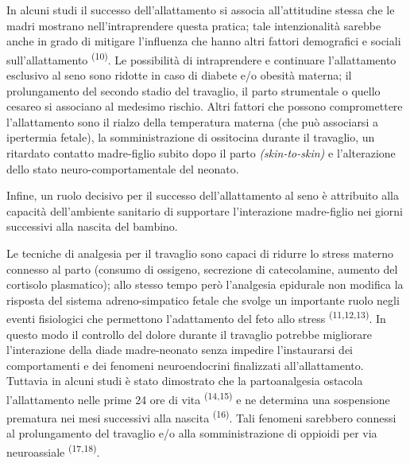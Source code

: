 \documentclass[]{article}
\begin{document}
In alcuni studi il successo dell'allattamento si associa all'attitudine
stessa che le madri mostrano nell'intraprendere questa pratica; tale
intenzionalità sarebbe anche in grado di mitigare l'influenza che hanno
altri fattori demografici e sociali sull'allattamento
\textsuperscript{(10)}. Le possibilità di intraprendere e continuare
l'allattamento esclusivo al seno sono ridotte in caso di diabete e/o
obesità materna; il prolungamento del secondo stadio del travaglio, il
parto strumentale o quello cesareo si associano al medesimo rischio.
Altri fattori che possono compromettere l'allattamento sono il rialzo
della temperatura materna (che può associarsi a ipertermia fetale), la
somministrazione di ossitocina durante il travaglio, un ritardato
contatto madre-figlio subito dopo il parto \emph{(skin-to-skin)} e
l'alterazione dello stato neuro-comportamentale del neonato.

Infine, un ruolo decisivo per il successo dell'allattamento al seno è
attribuito alla capacità dell'ambiente sanitario di supportare
l'interazione madre-figlio nei giorni successivi alla nascita del
bambino.

Le tecniche di analgesia per il travaglio sono capaci di ridurre lo
stress materno connesso al parto (consumo di ossigeno, secrezione di
catecolamine, aumento del cortisolo plasmatico); allo stesso tempo però
l'analgesia epidurale non modifica la risposta del sistema
adreno-simpatico fetale che svolge un importante ruolo negli eventi
fisiologici che permettono l'adattamento del feto allo stress
\textsuperscript{(11,12,13)}. In questo modo il controllo del dolore
durante il travaglio potrebbe migliorare l'interazione della diade
madre-neonato senza impedire l'instaurarsi dei comportamenti e dei
fenomeni neuroendocrini finalizzati all'allattamento. Tuttavia in alcuni
studi è stato dimostrato che la partoanalgesia ostacola l'allattamento
nelle prime 24 ore di vita \textsuperscript{(14,15)} e ne determina una
sospensione prematura nei mesi successivi alla nascita
\textsuperscript{(16)}. Tali fenomeni sarebbero connessi al
prolungamento del travaglio e/o alla somministrazione di oppioidi per
via neuroassiale \textsuperscript{(17,18)}.
\end{document}
